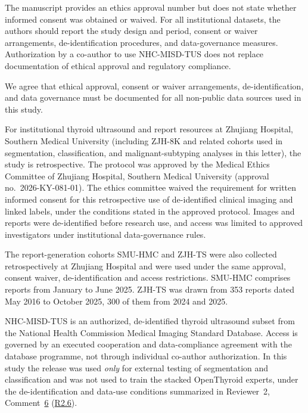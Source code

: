 \label{rev:R2.15}
\begin{reviewercomment}
The manuscript provides an ethics approval number but does not state whether informed consent was obtained or waived. For all institutional datasets, the authors should report the study design and period, consent or waiver arrangements, de-identification procedures, and data-governance measures. Authorization by a co-author to use NHC-MISD-TUS does not replace documentation of ethical approval and regulatory compliance.
\end{reviewercomment}
\begin{authorresponse}
We agree that ethical approval, consent or waiver arrangements, de-identification, and data governance must be documented for all non-public data sources used in this study.\par
For institutional thyroid ultrasound and report resources at Zhujiang Hospital, Southern Medical University (including ZJH-8K and related cohorts used in segmentation, classification, and malignant-subtyping analyses in this letter), the study is retrospective. The protocol was approved by the Medical Ethics Committee of Zhujiang Hospital, Southern Medical University (approval no.\ 2026-KY-081-01). The ethics committee waived the requirement for written informed consent for this retrospective use of de-identified clinical imaging and linked labels, under the conditions stated in the approved protocol. Images and reports were de-identified before research use, and access was limited to approved investigators under institutional data-governance rules.\par
The report-generation cohorts SMU-HMC and ZJH-TS were also collected retrospectively at Zhujiang Hospital and were used under the same approval, consent waiver, de-identification and access restrictions. SMU-HMC comprises reports from January to June 2025. ZJH-TS was drawn from 353 reports dated May 2016 to October 2025, 300 of them from 2024 and 2025.\par
NHC-MISD-TUS is an authorized, de-identified thyroid ultrasound subset from the National Health Commission Medical Imaging Standard Database. Access is governed by an executed cooperation and data-compliance agreement with the database programme, not through individual co-author authorization. In this study the release was used \emph{only} for external testing of segmentation and classification and was not used to train the stacked OpenThyroid experts, under the de-identification and data-use conditions summarized in Reviewer~2, Comment~\hyperref[rev:R2.6]{6} (\hyperref[rev:R2.6]{R2.6}).\par
\end{authorresponse}

